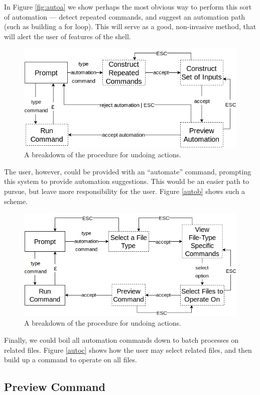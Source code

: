 In Figure \ref{fig:autoa} we show perhaps the most obvious way to perform this sort
of automation --- detect repeated commands, and suggest an automation path (such
as building a for loop). This will serve as a good, non-invasive method, that
will alert the user of features of the shell.

\begin{figure}[H]
  \centering
  \includegraphics[width=0.8\linewidth]{figures/alternatives/automate_b.png}
  \caption{A breakdown of the procedure for undoing actions.}
  \label{fig:autob}
\end{figure}

The user, however, could be provided with an ``automate'' command, prompting
this system to provide automation suggestions. This would be an easier path to
pursue, but leave more responsibility for the user. Figure \ref{autob} shows
such a scheme.

\begin{figure}[H]
  \centering
  \includegraphics[width=0.8\linewidth]{figures/alternatives/automate_c.png}
  \caption{A breakdown of the procedure for undoing actions.}
  \label{fig:autoc}
\end{figure}

Finally, we could boil all automation commands down to batch processes on
related files. Figure \ref{autoc} shows how the user may select related files,
and then build up a command to operate on all files.

\subsection{Preview Command}

